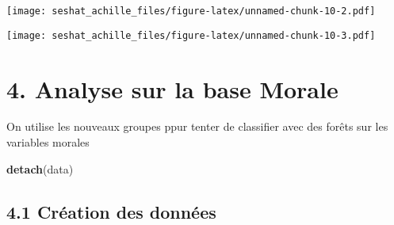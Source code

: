 \documentclass[
]{article}
\newenvironment{Shaded}{\begin{snugshade}}{\end{snugshade}}
\newcommand{\CommentTok}[1]{\textcolor[rgb]{0.56,0.35,0.01}{\textit{#1}}}
\newcommand{\ControlFlowTok}[1]{\textcolor[rgb]{0.13,0.29,0.53}{\textbf{#1}}}
\newcommand{\DataTypeTok}[1]{\textcolor[rgb]{0.13,0.29,0.53}{#1}}
\newcommand{\DecValTok}[1]{\textcolor[rgb]{0.00,0.00,0.81}{#1}}
\newcommand{\KeywordTok}[1]{\textcolor[rgb]{0.13,0.29,0.53}{\textbf{#1}}}
\newcommand{\NormalTok}[1]{#1}
\newcommand{\OperatorTok}[1]{\textcolor[rgb]{0.81,0.36,0.00}{\textbf{#1}}}
\newcommand{\StringTok}[1]{\textcolor[rgb]{0.31,0.60,0.02}{#1}}
\begin{document}
\texttt{[image: seshat\_achille\_files/figure-latex/unnamed-chunk-10-2.pdf]}

\begin{Shaded}
\end{Shaded}

\texttt{[image: seshat\_achille\_files/figure-latex/unnamed-chunk-10-3.pdf]}

\hypertarget{analyse-sur-la-base-morale}{%
\section{4. Analyse sur la base
Morale}\label{analyse-sur-la-base-morale}}

On utilise les nouveaux groupes ppur tenter de classifier avec des
forêts sur les variables morales

\begin{Shaded}
\begin{Highlighting}[]
\KeywordTok{detach}\NormalTok{(data)}
\end{Highlighting}
\end{Shaded}

\hypertarget{cruxe9ation-des-donnuxe9es}{%
\subsection{4.1 Création des données}\label{cruxe9ation-des-donnuxe9es}}
\end{document}
